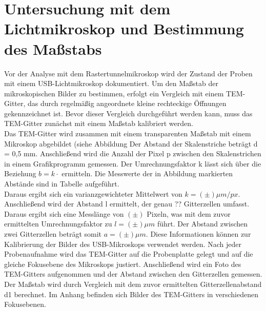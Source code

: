 \chapter{Untersuchung mit dem Lichtmikroskop und Bestimmung des Maßstabs}
Vor der Analyse mit dem Rastertunnelmikroskop wird der Zustand der Proben mit einem USB-Lichtmikroskop dokumentiert. Um den Maßstab der mikroskopischen Bilder zu bestimmen, erfolgt ein Vergleich mit einem TEM-Gitter, das durch regelmäßig angeordnete kleine rechteckige Öffnungen gekennzeichnet ist. Bevor dieser Vergleich durchgeführt werden kann, muss das TEM-Gitter zunächst mit einem Maßstab kalibriert werden.\\

Das TEM-Gitter wird zusammen mit einem transparenten Maßstab mit einem Mikroskop abgebildet (siehe Abbildung %
Der Abstand der Skalenstriche beträgt d = 0,5 mm. %
Anschließend wird die Anzahl der Pixel p zwischen den Skalenstrichen in einem Grafikprogramm gemessen. Der Umrechnungsfaktor k lässt sich über die Beziehung $b = k\cdotp$ ermitteln. Die Messwerte der in Abbildung %
markierten Abstände sind in Tabelle %
aufgeführt.\\ %

Daraus ergibt sich ein varianzgewichteter Mittelwert von $k = ( \pm ) \mu m/px$. Anschließend wird der Abstand l ermittelt, der genau ?? Gitterzellen umfasst. Daraus ergibt sich eine Messlänge von $(\pm)$ Pixeln, was mit dem zuvor ermittelten Umrechnungsfaktor zu $l = (\pm) \mu m$ führt. Der Abstand zwischen zwei Gitterzellen beträgt somit $a = (\pm) \mu m$.
Diese Informationen können zur Kalibrierung der Bilder des USB-Mikroskops verwendet werden. Nach jeder Probenaufnahme wird das TEM-Gitter auf die Probenplatte gelegt und auf die gleiche Fokusebene des Mikroskops justiert. Anschließend wird ein Foto des TEM-Gitters aufgenommen und der Abstand zwischen den Gitterzellen gemessen. Der Maßstab wird durch Vergleich mit dem zuvor ermittelten Gitterzellenabstand d1 berechnet. Im Anhang befinden sich Bilder des TEM-Gitters in verschiedenen Fokusebenen.